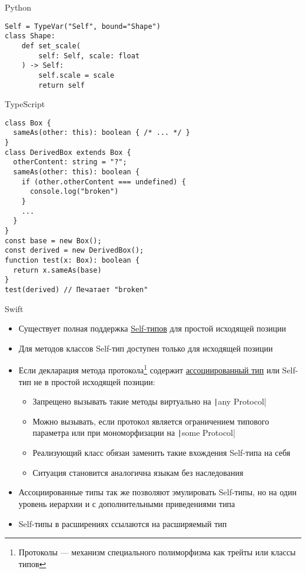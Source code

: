 \documentclass[handout,aspectratio=169,usenames,dvipsnames]{beamer}
\begin{document}
\begin{frame}[fragile]{Python}
                \begin{verbatim}
Self = TypeVar("Self", bound="Shape")
class Shape:
    def set_scale(
        self: Self, scale: float
    ) -> Self:
        self.scale = scale
        return self
                \end{verbatim}
\end{frame}

\begin{frame}[fragile]{TypeScript}
                \begin{verbatim}
class Box {
  sameAs(other: this): boolean { /* ... */ }
}
class DerivedBox extends Box {
  otherContent: string = "?";
  sameAs(other: this): boolean {
    if (other.otherContent === undefined) {
      console.log("broken")
    }
    ...
  }
}
const base = new Box();
const derived = new DerivedBox();
function test(x: Box): boolean {
  return x.sameAs(base)
}
test(derived) // Печатает "broken"
                \end{verbatim}
\end{frame}

\begin{frame}{Swift}
    \begin{itemize}
        \item Существует полная поддержка \href{https://docs.swift.org/swift-book/documentation/the-swift-programming-language/types/\#Self-Type}{\color{blue}Self-типов} для простой исходящей позиции \pause
        \item Для методов классов Self-тип доступен только для исходящей позиции \pause
        \item Если декларация метода протокола\footnote{Протоколы --- механизм специального полиморфизма как трейты или классы типов} содержит \href{https://docs.swift.org/swift-book/documentation/the-swift-programming-language/generics/\#Associated-Types}{\color{blue}ассоциированный тип} или Self-тип не в простой исходящей позиции: \pause
        \begin{itemize}
            \item Запрещено вызывать такие методы виртуально на \texttt|any Protocol|
            \item Можно вызывать, если протокол является ограничением типового параметра или при мономорфизации на \texttt|some Protocol|
            \item Реализующий класс обязан заменить такие вхождения Self-типа на себя
            \item Ситуация становится аналогична языкам без наследования
        \end{itemize} \pause
        \item Ассоциированные типы так же позволяют эмулировать Self-типы, но на один уровень иерархии и с дополнительными приведениями типа \pause
        \item Self-типы в расширениях ссылаются на расширяемый тип
    \end{itemize}
\end{frame}
\end{document}
